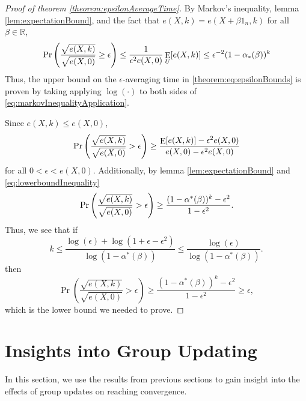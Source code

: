 \documentclass{amsart}
\DeclareMathOperator{\E}{E}
\newcommand{\R}[0]{\mathbb{R}}
\theoremstyle{remark}
\begin{document}
\begin{proof}[Proof of theorem \ref{theorem:epsilonAverageTime}]
	By Markov's inequality, lemma \ref{lem:expectationBound}, and the fact that $e(X,k) = e(X+\beta1_n,k)$ for all $\beta\in\R$,
\begin{equation}{\label{eq:markovInequalityApplication}}
	\Pr\left(\frac{\sqrt{e(X,k)}}{\sqrt{e(X,0)}}\geq \epsilon\right) \leq \frac{1}{\epsilon^{2}e(X,0)}\E_U[e(X,k)] \leq \epsilon^{-2}(1-\alpha_*(\beta))^k
\end{equation}
Thus, the upper bound on the $\epsilon$-averaging time in \eqref{theorem:eq:epsilonBounds} is proven by taking applying $\log(\cdot)$ to both sides of \eqref{eq:markovInequalityApplication}. 

Since $e(X,k)\leq e(X,0)$,
\begin{equation}{\label{eq:lowerboundInequality}}
	\Pr\left(\frac{\sqrt{e(X,k)}}{\sqrt{e(X,0)}}>\epsilon\right) \geq \frac{\E[e(X,k)]-\epsilon^2e(X,0)}{e(X,0)-\epsilon^2e(X,0)}
\end{equation}
for all $0<\epsilon<e(X,0)$. Additionally, by lemma \ref{lem:expectationBound} and \eqref{eq:lowerboundInequality}
\begin{equation}{\label{eq:lowerboundInequality2}}
	\Pr\left(\frac{\sqrt{e(X,k)}}{\sqrt{e(X,0)}}>\epsilon\right)\geq \frac{(1-\alpha^*(\beta))^k-\epsilon^2}{1-\epsilon^2}.
\end{equation}
Thus, we see that if
\begin{equation}
	k\leq \frac{\log(\epsilon)+\log(1+\epsilon-\epsilon^2)}{\log(1-\alpha^*(\beta))} \leq \frac{\log(\epsilon)}{\log(1-\alpha^*(\beta))}.
\end{equation}
then
\begin{equation}
	\Pr\left(\frac{\sqrt{e(X,k)}}{\sqrt{e(X,0)}}>\epsilon\right)\geq \frac{(1-\alpha^*(\beta))^k-\epsilon^2}{1-\epsilon^2} \geq \epsilon,
\end{equation}
which is the lower bound we needed to prove.
\end{proof}

\section{Insights into Group Updating}

In this section, we use the results from previous sections to gain insight into the effects of group updates on reaching convergence.
\end{document}

